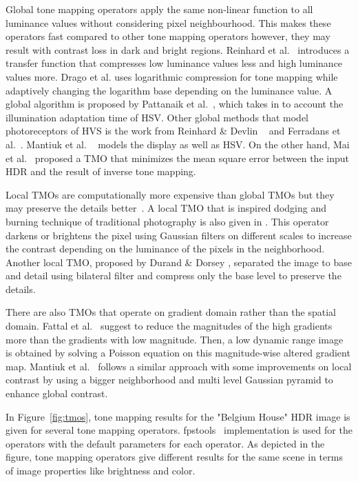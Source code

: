 Global tone mapping operators apply the same non-linear function to all luminance values without considering pixel neighbourhood. This makes these operators fast compared to other tone mapping operators however, they may result with contrast loss in dark and bright regions. Reinhard et al.~\cite{reinhard2002photographic} introduces a transfer function that compresses low luminance values less and high luminance values more. Drago et al. \cite{drago2003adaptive} uses logarithmic compression for tone mapping while adaptively changing the logarithm base depending on the luminance value. A global algorithm is proposed by Pattanaik et al.~\cite{pattanaik2000time}, which takes in to account the illumination adaptation time of HSV. Other global methods that model photoreceptors of HVS is the work from Reinhard \& Devlin ~\cite{reinhard2005dynamic} and Ferradans et al.~\cite{ferradans2011analysis}. Mantiuk et al. ~\cite{mantiuk2008display} models the display as well as HSV. On the other hand, Mai et al.~\cite{mai2010optimizing} proposed a TMO that minimizes the mean square error between the input HDR and the result of inverse tone mapping.

Local TMOs are computationally more expensive than global TMOs but they may preserve the details better~\cite{Rein2010}. A local TMO that is inspired dodging and burning technique of traditional photography is also given in \cite{reinhard2002photographic}. This operator darkens or brightens the pixel using Gaussian filters on different scales to increase the contrast  depending on the luminance of the pixels in the neighborhood. Another local TMO, proposed by Durand \& Dorsey \cite{durand2002fast}, separated the image to base and detail using bilateral filter and compress only the base level to preserve the details. 

There are also TMOs that operate on gradient domain rather than the spatial domain. Fattal et al.~\cite{fattal2002gradient} suggest to reduce the magnitudes of the high gradients more than the gradients with low magnitude. Then, a low dynamic range image is obtained by solving a Poisson equation on this magnitude-wise altered gradient map. Mantiuk et al.~\cite{mantiuk2006perceptual} follows a similar approach with some improvements on local contrast by using a bigger neighborhood and multi level Gaussian pyramid to enhance global contrast.

In Figure~\ref{fig:tmos}, tone mapping results for the "Belgium House" HDR image is given for several tone mapping operators. fpstools~\cite{HDRGallery} implementation is used for the operators with the default parameters for each operator. As depicted in the figure, tone mapping operators give different results for the same scene in terms of image properties like brightness and color.


